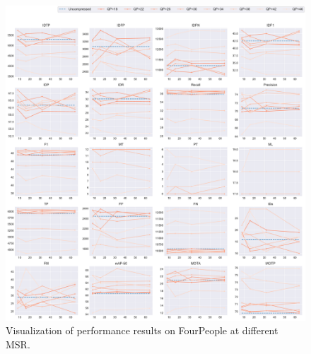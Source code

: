 \begin{figure}[!htbp]
\centering
\includegraphics[width=1.0\linewidth]{img/appendix/FourPeople_all_multiplots_msr.pdf}
\caption[Visualization of performance results on FourPeople at different MSR]
{Visualization of performance results on FourPeople at different MSR.}
\label{fig:FourPeople_all_msr}
\end{figure}




